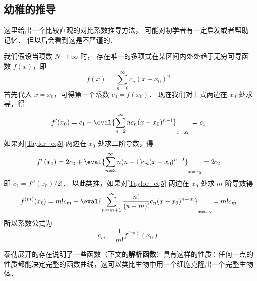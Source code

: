 \subsection{幼稚的推导}
这里给出一个比较直观的对比系数推导方法， 可能对初学者有一定启发或者帮助记忆． 但以后会看到这是不严谨的．

我们假设当项数 $N \to \infty$ 时， 存在唯一的多项式在某区间内处处趋于无穷可导函数 $f(x)$，即
\begin{equation}\label{Taylor_eq5}
f(x) = \sum_{n = 0}^\infty  c_n (x - x_0)^n
\end{equation}
首先代入 $x = x_0$，可得第一个系数 $c_0 = f(x_0)$． 现在我们对上式两边在 $x_0$ 处求导，得
\begin{equation}
f'(x_0) = c_1 + \eval{ \sum_{n = 2}^\infty n c_n (x - x_0)^{n - 1} }_{x = x_0}  = c_1
\end{equation}
如果对\autoref{Taylor_eq5} 两边在 $x_0$ 处求二阶导数，得
\begin{equation}
f''(x_0) = 2 c_2 + \eval{ \sum_{n = 3}^\infty  n(n - 1) c_n (x - x_0)^{n - 2} }_{x = x_0}  = 2 c_2
\end{equation}
即 $c_2 = f''(x_0)/2!$．  以此类推，如果对\autoref{Taylor_eq5} 两边在 $x_0$ 处求 $m$ 阶导数得
\begin{equation}
f^{(m)}(x_0) = m! c_m + \eval{ \sum_{n = m + 1}^\infty  \frac{n!}{(n - m)!} c_n (x - x_0)^{n - m} }_{x = x_0}  = m! c_m
\end{equation}
所以系数公式为
\begin{equation}
{c_m} = \frac{1}{m!} f^{(m)}(x_0)
\end{equation}

泰勒展开的存在说明了一些函数（下文的\textbf{解析函数}）具有这样的性质：任何一点的性质都能决定完整的函数曲线，这可以类比生物中用一个细胞克隆出一个完整生物体．



